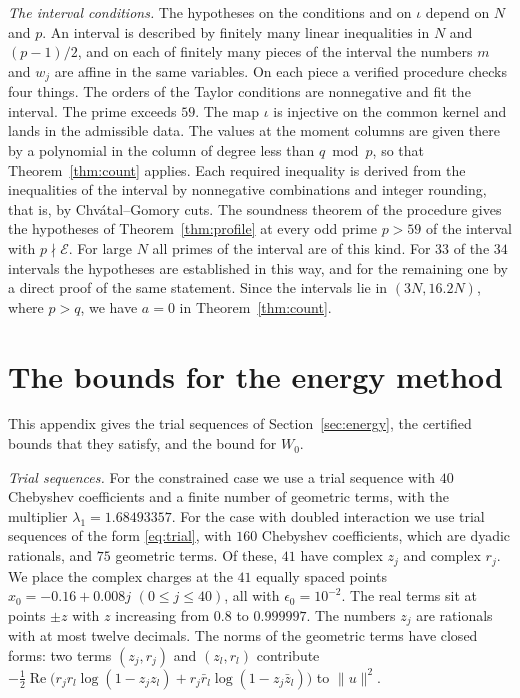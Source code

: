 \documentclass[11pt]{amsart}
\newcommand{\Kcoef}{160}
\newcommand{\Ngeo}{75}
\newcommand{\Ncomplex}{41}
\theoremstyle{definition}
\theoremstyle{remark}
\numberwithin{equation}{section}
\begin{document}
\emph{The interval conditions.} The hypotheses on the conditions and on $\iota$ depend on $N$ and $p$. An
interval is described by finitely many linear inequalities in $N$ and $(p-1)/2$, and on each of finitely many
pieces of the interval the numbers $m$ and $w_j$ are affine in the same variables. On each piece a verified
procedure checks four things. The orders of the Taylor conditions are nonnegative and fit the interval. The
prime exceeds $59$. The map $\iota$ is injective on the common kernel and lands in the admissible data. The
values at the moment columns are given there by a polynomial in the column of degree less than $q\bmod p$,
so that Theorem~\ref{thm:count} applies. Each required inequality is derived from the inequalities of the
interval by nonnegative combinations and integer rounding, that is, by Chv\'atal--Gomory cuts. The soundness
theorem of the procedure gives the hypotheses of Theorem~\ref{thm:profile} at every odd prime $p>59$ of the
interval with $p\nmid\mathcal E$. For large $N$ all primes of the interval are of this kind. For $33$ of the
$34$ intervals the hypotheses are established in this way, and for the remaining one by a direct proof of
the same statement. Since the intervals lie in $(3N,16.2N)$, where $p>q$, we have $a=0$ in
Theorem~\ref{thm:count}.

\section{The bounds for the energy method}\label{app:field}

This appendix gives the trial sequences of Section~\ref{sec:energy}, the certified bounds that they satisfy, and
the bound for $W_0$.

\emph{Trial sequences.} For the constrained case we use a trial sequence with $40$ Chebyshev coefficients and a
finite number of geometric terms, with the multiplier $\lambda_1=1.68493357$. For the case with doubled
interaction we use trial sequences of the form \eqref{eq:trial}, with $\Kcoef$ Chebyshev coefficients, which are
dyadic rationals, and $\Ngeo$ geometric terms. Of these, $\Ncomplex$ have complex $z_j$ and complex $r_j$. We
place the complex charges at the $41$ equally spaced points $x_0=-0.16+0.008j$ $(0\le j\le40)$, all with
$\epsilon_0=10^{-2}$. The real terms sit at points $\pm z$ with $z$ increasing from $0.8$ to $0.999997$. The
numbers $z_j$ are rationals with at most twelve decimals. The norms of the geometric terms have closed forms:
two terms $(z_j,r_j)$ and $(z_l,r_l)$ contribute
$-\frac12\operatorname{Re}\bigl(r_jr_l\log(1-z_jz_l)+r_j\bar r_l\log(1-z_j\bar z_l)\bigr)$ to $\|u\|^2$.
\end{document}
